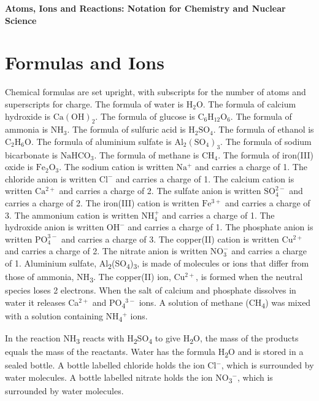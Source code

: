 \documentclass[11pt]{article}
\begin{document}
\begin{center}{\Large\bfseries Atoms, Ions and Reactions: Notation for Chemistry and Nuclear Science}\end{center}
\section*{Formulas and Ions}
Chemical formulas are set upright, with subscripts for the number of atoms and superscripts for charge.
The formula of water is \label{eq000}$\mathrm{H_2O}$. The formula of calcium hydroxide is \label{eq001}$\mathrm{Ca(OH)_2}$. The formula of glucose is \label{eq002}$\mathrm{C_6H_{12}O_6}$. The formula of ammonia is \label{eq003}$\mathrm{NH_3}$. The formula of sulfuric acid is \label{eq004}$\mathrm{H_2SO_4}$.
The formula of ethanol is \label{eq005}$\mathrm{C_2H_6O}$. The formula of aluminium sulfate is \label{eq006}$\mathrm{Al_2(SO_4)_3}$. The formula of sodium bicarbonate is \label{eq007}$\mathrm{NaHCO_3}$. The formula of methane is \label{eq008}$\mathrm{CH_4}$. The formula of iron(III) oxide is \label{eq009}$\mathrm{Fe_2O_3}$.
The sodium cation is written \label{eq010}$\mathrm{Na^+}$ and carries a charge of 1. The chloride anion is written \label{eq011}$\mathrm{Cl^-}$ and carries a charge of 1. The calcium cation is written \label{eq012}$\mathrm{Ca^{2+}}$ and carries a charge of 2. The sulfate anion is written \label{eq013}$\mathrm{SO_4^{2-}}$ and carries a charge of 2. The iron(III) cation is written \label{eq014}$\mathrm{Fe^{3+}}$ and carries a charge of 3.
The ammonium cation is written \label{eq015}$\mathrm{NH_4^+}$ and carries a charge of 1. The hydroxide anion is written \label{eq016}$\mathrm{OH^-}$ and carries a charge of 1. The phosphate anion is written \label{eq017}$\mathrm{PO_4^{3-}}$ and carries a charge of 3. The copper(II) cation is written \label{eq018}$\mathrm{Cu^{2+}}$ and carries a charge of 2. The nitrate anion is written \label{eq019}$\mathrm{NO_3^-}$ and carries a charge of 1.
Aluminium sulfate, Al\textsubscript{2}(SO\textsubscript{4})\textsubscript{3}, is made of molecules or ions that differ from those of ammonia, NH\textsubscript{3}. The copper(II) ion, Cu$^{2+}$, is formed when the neutral species loses 2 electrons. When the salt of calcium and phosphate dissolves in water it releases Ca$^{2+}$ and PO\textsubscript{4}$^{3-}$ ions. A solution of methane (CH\textsubscript{4}) was mixed with a solution containing NH\textsubscript{4}$^{+}$ ions.

In the reaction NH\textsubscript{3} reacts with H\textsubscript{2}SO\textsubscript{4} to give H\textsubscript{2}O, the mass of the products equals the mass of the reactants. Water has the formula H\textsubscript{2}O and is stored in a sealed bottle. A bottle labelled chloride holds the ion Cl$^{-}$, which is surrounded by water molecules. A bottle labelled nitrate holds the ion NO\textsubscript{3}$^{-}$, which is surrounded by water molecules.
\end{document}
